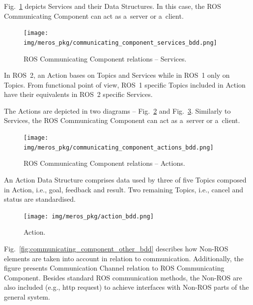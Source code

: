 \documentclass[11pt,oneside,a4paper]{report}
\begin{document}
	\pagebreak
	
	Fig.~\ref{fig:communication_blocks_services_bdd} depicts Services and their Data Structures. In this case, the ROS Communicating Component can act as a~server or a~client.	
	
		
	\begin{figure}[H]
		\centering
		\begin{center}
			{\texttt{[image: img/meros\_pkg/communicating\_component\_services\_bdd.png]}}
		\end{center}
		\caption{ROS Communicating Component relations -- Services.} 
		\label{fig:communication_blocks_services_bdd}
	\end{figure}
	
	In ROS~2, an Action bases on Topics and Services while in ROS~1 only on Topics. From functional point of view, ROS~1 specific Topics included in Action have their equivalents in ROS~2 specific Services. 
	
	
	The Actions are depicted in two diagrams -- Fig.~\ref{fig:communicating_component_actions_bdd} and Fig.~\ref{fig:action_bdd}. Similarly to Services, the ROS Communicating Component can act as a~server or a~client.	 
	
	
	\begin{figure}[H]
		\centering
		\begin{center}
			{\texttt{[image: img/meros\_pkg/communicating\_component\_actions\_bdd.png]}}
		\end{center}
		\caption{ROS Communicating Component relations -- Actions.} 
		\label{fig:communicating_component_actions_bdd}
	\end{figure}
	
	An Action Data Structure comprises data used by three of five Topics composed in Action, i.e., goal, feedback and result. Two remaining Topics, i.e., cancel and status are standardised.
	
	\begin{figure}[hbt]
		\centering
		\begin{center}
			{\texttt{[image: img/meros\_pkg/action\_bdd.png]}}
		\end{center}
		\caption{Action.} 
		\label{fig:action_bdd}
	\end{figure}
	
	\pagebreak
	Fig.~\ref{fig:communicating_component_other_bdd} describes how Non-ROS elements are taken into account in relation to communication. Additionally, the figure presents Communication Channel relation to ROS Communicating Component. Besides standard ROS communication methods, the Non-ROS are also included (e.g., http request) to achieve interfaces with Non-ROS parts of the general system. 
	
\end{document}

